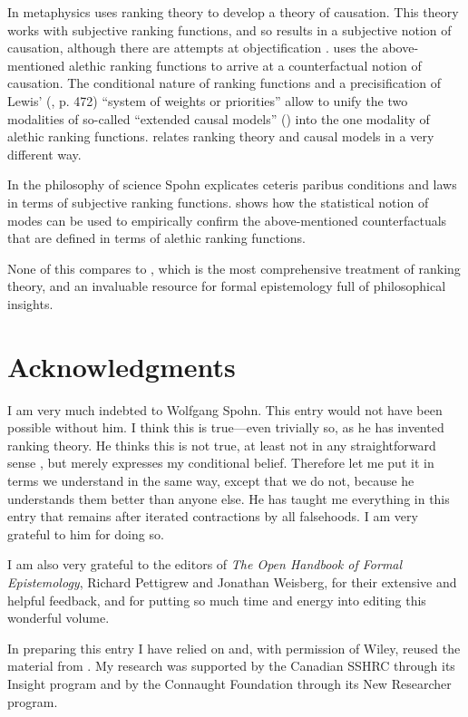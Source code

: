 In metaphysics \citet{s83, s06b} uses ranking theory to develop a theory of causation. This theory works with subjective ranking functions, and so results in a subjective notion of causation, although there are attempts at objectification \citep[chapter 15]{s93,s12}. \citet{h11} uses the above-mentioned alethic ranking functions to arrive at a counterfactual notion of causation. The conditional nature of ranking functions and a precisification of Lewis' (, p. 472) ``system of weights or priorities'' allow \citet{h13a} to unify the two modalities of so-called ``extended causal models'' (\citealt{h08,hh10}) into the one modality of alethic ranking functions. \citet{s10b} relates ranking theory and causal models in a very different way.

In the philosophy of science Spohn explicates ceteris paribus conditions \citep{s02, s14} and laws \citep{s05} in terms of subjective ranking functions. \citet{h15b} shows how the statistical notion of modes can be used to empirically confirm the above-mentioned counterfactuals that are defined in terms of alethic ranking functions.

None of this compares to \citet{s12}, which is the most comprehensive treatment of ranking theory, and an invaluable resource for formal epistemology full of philosophical insights.


\section*{Acknowledgments}

I am very much indebted to Wolfgang Spohn. This entry would not have been possible without him. I think this is true---even trivially so, as he has invented ranking theory. He thinks this is not true, at least not in any straightforward sense \citep[Section 8]{s15}, but merely expresses my conditional belief. Therefore let me put it in terms we understand in the same way, except that we do not, because he understands them better than anyone else. He has taught me everything in this entry that remains after iterated contractions by all falsehoods. I am very grateful to him for doing so.

I am also very grateful to the editors of \emph{The Open Handbook of Formal Epistemology}, Richard Pettigrew and Jonathan Weisberg, for their extensive and helpful feedback, and for putting so much time and energy into editing this wonderful volume.

In preparing this entry I have relied on and, with permission of Wiley, reused the material from \citet{h13b, h13c}. My research was supported by the Canadian SSHRC through its Insight program and by the Connaught Foundation through its New Researcher program.